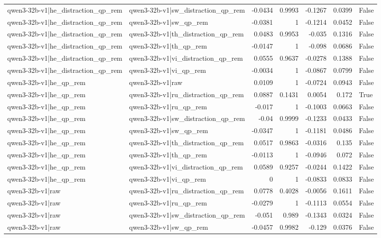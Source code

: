 \begin{table}
\begin{tabular}{l l r r r r l}
qwen3-32b-v1|he_distraction_qp_rem & qwen3-32b-v1|sw_distraction_qp_rem & -0.0434 & 0.9993 & -0.1267 & 0.0399 & False \\
qwen3-32b-v1|he_distraction_qp_rem & qwen3-32b-v1|sw_qp_rem & -0.0381 & 1 & -0.1214 & 0.0452 & False \\
qwen3-32b-v1|he_distraction_qp_rem & qwen3-32b-v1|th_distraction_qp_rem & 0.0483 & 0.9953 & -0.035 & 0.1316 & False \\
qwen3-32b-v1|he_distraction_qp_rem & qwen3-32b-v1|th_qp_rem & -0.0147 & 1 & -0.098 & 0.0686 & False \\
qwen3-32b-v1|he_distraction_qp_rem & qwen3-32b-v1|vi_distraction_qp_rem & 0.0555 & 0.9637 & -0.0278 & 0.1388 & False \\
qwen3-32b-v1|he_distraction_qp_rem & qwen3-32b-v1|vi_qp_rem & -0.0034 & 1 & -0.0867 & 0.0799 & False \\
qwen3-32b-v1|he_qp_rem & qwen3-32b-v1|raw & 0.0109 & 1 & -0.0724 & 0.0943 & False \\
qwen3-32b-v1|he_qp_rem & qwen3-32b-v1|ru_distraction_qp_rem & 0.0887 & 0.1431 & 0.0054 & 0.172 & True \\
qwen3-32b-v1|he_qp_rem & qwen3-32b-v1|ru_qp_rem & -0.017 & 1 & -0.1003 & 0.0663 & False \\
qwen3-32b-v1|he_qp_rem & qwen3-32b-v1|sw_distraction_qp_rem & -0.04 & 0.9999 & -0.1233 & 0.0433 & False \\
qwen3-32b-v1|he_qp_rem & qwen3-32b-v1|sw_qp_rem & -0.0347 & 1 & -0.1181 & 0.0486 & False \\
qwen3-32b-v1|he_qp_rem & qwen3-32b-v1|th_distraction_qp_rem & 0.0517 & 0.9863 & -0.0316 & 0.135 & False \\
qwen3-32b-v1|he_qp_rem & qwen3-32b-v1|th_qp_rem & -0.0113 & 1 & -0.0946 & 0.072 & False \\
qwen3-32b-v1|he_qp_rem & qwen3-32b-v1|vi_distraction_qp_rem & 0.0589 & 0.9257 & -0.0244 & 0.1422 & False \\
qwen3-32b-v1|he_qp_rem & qwen3-32b-v1|vi_qp_rem & 0 & 1 & -0.0833 & 0.0833 & False \\
qwen3-32b-v1|raw & qwen3-32b-v1|ru_distraction_qp_rem & 0.0778 & 0.4028 & -0.0056 & 0.1611 & False \\
qwen3-32b-v1|raw & qwen3-32b-v1|ru_qp_rem & -0.0279 & 1 & -0.1113 & 0.0554 & False \\
qwen3-32b-v1|raw & qwen3-32b-v1|sw_distraction_qp_rem & -0.051 & 0.989 & -0.1343 & 0.0324 & False \\
qwen3-32b-v1|raw & qwen3-32b-v1|sw_qp_rem & -0.0457 & 0.9982 & -0.129 & 0.0376 & False \\

\end{tabular}
\end{table}
